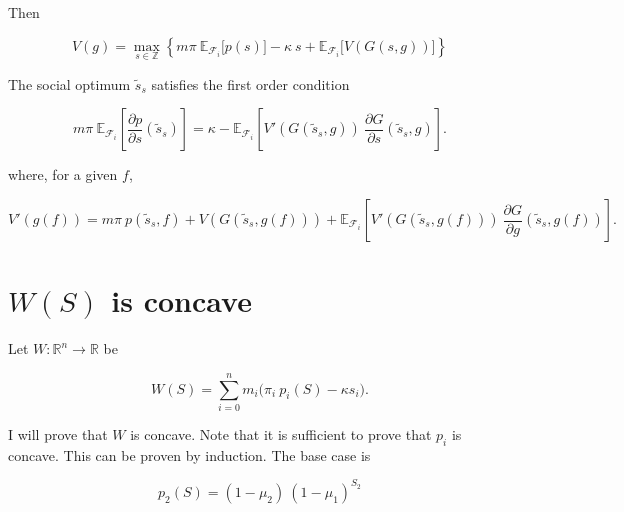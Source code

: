 \documentclass[american, abstract=on]{scrartcl}
\renewcommand{\Re}{\mathbb{R}}
\newcommand{\F}{\mathcal{F}}
\newcommand{\E}{\mathbb{E}}
\begin{document}
Then

\begin{equation}
  V(g) = \max_{s \in \mathbb{Z}} \left\{ m \pi \ \E_{\F_i} \Big[ p(s) \Big] - \kappa \ s + \E_{\F_i}\Big[  V\left(G(s, g)\right)\Big] \right\}
\end{equation}

The social optimum $\tilde{s}_s$ satisfies the first order condition

\begin{equation}
  m \pi \ \E_{\F_i} \left[ \frac{\partial p}{\partial s}\left(\tilde{s}_s\right) \right] = \kappa - \E_{\F_i} \left[ V'(G(\tilde{s}_s, g)) \ \frac{\partial G}{\partial s}(\tilde{s}_s, g)\right].
\end{equation}

where, for a given $f$,

\begin{equation}
  V'(g(f)) = m \pi \ p(\tilde{s}_s, f) + V(G(\tilde{s}_s, g(f))) + \E_{\F_i}\left[ V'\left(G(\tilde{s}_s, g(f))\right) \  \frac{\partial G}{\partial g}(\tilde{s}_s, g(f)) \right].
\end{equation}

\fi

\newpage
\printbibliography

\newpage
\appendix
\section[Concavity of social planner problem]{$W(S)$ is concave}

Let $W: \Re^n \to \Re$ be

\begin{equation}
  W(S) = \sum^n_{i = 0} m_i \Big( \pi_i \ p_i(S) - \kappa s_i \Big).
\end{equation}

I will prove that $W$ is concave. Note that it is sufficient to prove that $p_i$ is concave. This can be proven by induction. The base case is 

\begin{equation}
  p_2(S) = (1 - \mu_2) \ (1 - \mu_1)^{S_2}
\end{equation}
\end{document}
